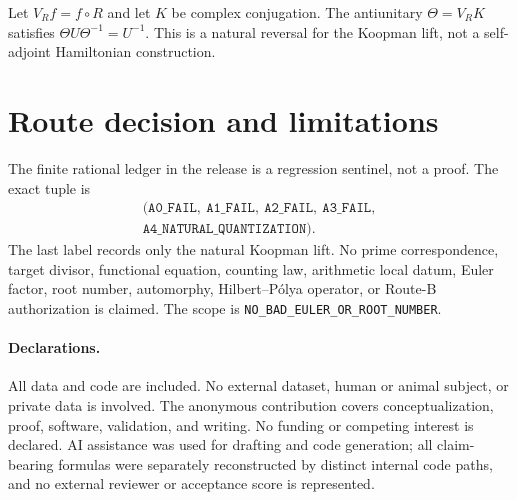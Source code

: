 \documentclass[10pt]{article}
\begin{document}
Let $V_Rf=f\circ R$ and let $K$ be complex conjugation.  The antiunitary
$\Theta=V_RK$ satisfies
$\Theta U\Theta^{-1}=U^{-1}$.  This is a natural reversal for the Koopman
lift, not a self-adjoint Hamiltonian construction.

\section{Route decision and limitations}
The finite rational ledger in the release is a regression sentinel, not a
proof.  The exact tuple is
\[
\begin{gathered}
(\texttt{A0\_FAIL},\ \texttt{A1\_FAIL},\ \texttt{A2\_FAIL},\
 \texttt{A3\_FAIL},\\[-1mm]
 \texttt{A4\_NATURAL\_QUANTIZATION}).
\end{gathered}
\]
The last label records only the natural Koopman lift.  No prime
correspondence, target
divisor, functional equation, counting law, arithmetic local datum, Euler
factor, root number, automorphy, Hilbert--Pólya operator, or Route-B
authorization is claimed.  The scope is
\texttt{NO\_BAD\_EULER\_OR\_ROOT\_NUMBER}.

\paragraph{Declarations.}
All data and code are included.  No external dataset, human or animal
subject, or private data is involved.  The anonymous contribution covers
conceptualization, proof, software, validation, and writing.  No funding or
competing interest is declared.  AI assistance was used for drafting and
code generation; all claim-bearing formulas were separately reconstructed by
distinct internal code paths, and no external reviewer or acceptance score is
represented.
\end{document}
